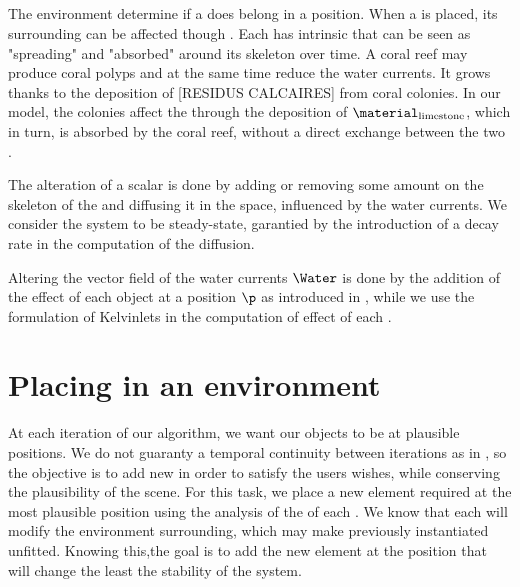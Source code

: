 \subsection{}
The environment determine if a  does belong in a position. When a  is placed, its surrounding  can be affected though . Each  has intrinsic  that can be seen as "spreading" and "absorbed" around its skeleton over time. A coral reef may produce coral polyps and at the same time reduce the water currents. It grows thanks to the deposition of [RESIDUS CALCAIRES] from coral colonies. In our model, the colonies affect the  through the deposition of  $\material_\text{limestone}$, which in turn, is absorbed by the coral reef, without a direct exchange between the two .

The alteration of a scalar  is done by adding or removing some amount on the skeleton of the  and diffusing it in the space, influenced by the water currents. We consider the system to be steady-state, garantied by the introduction of a decay rate in the computation of the diffusion.

Altering the vector field of the water currents $\Water$ is done by the addition of the effect of each object at a position $\p$ as introduced in \citep{Wejchert1991}, while we use the formulation of Kelvinlets \cite{DeGoes2017} in the computation of effect of each .

\section{Placing  in an environment}
\label{sec:semantic-representation_generation-rules}
At each iteration of our algorithm, we want our objects to be at plausible positions. We do not guaranty a temporal continuity between iterations as in \citep{Ecormier-Nocca2021}, so the objective is to add new  in order to satisfy the users wishes, while conserving the plausibility of the scene. For this task, we place a new element required at the most plausible position using the analysis of the  of each . We know that each  will modify the environment surrounding, which may make previously instantiated  unfitted. Knowing this,the goal is to add the new element at the position that will change the least the stability of the system. 

